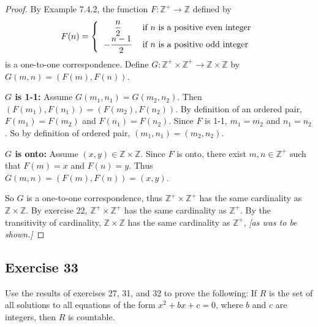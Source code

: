 \documentclass[14pt]{extarticle}
\newcommand{\dps}{\displaystyle}
\newcommand{\Z}{\mathbb{Z}}
\begin{document}
\begin{proof}
    By Example 7.4.2, the function \(F:\Z^+ \to \Z\) defined by
    \[
        F(n) =
        \left\{
        \begin{tabular}{cl}
            \(\dps \frac{n}{2}\)    & if $n$ is a positive even integer \\
            \(\dps -\frac{n-1}{2}\) & if $n$ is a positive odd integer
        \end{tabular}
        \right.
    \]
    is a one-to-one correspondence. Define \(G: \Z^+ \times \Z^+ \to \Z \times \Z\) by \(G(m, n) = (F(m), F(n))\).

        {\bf $G$ is 1-1:} Assume \(G(m_1, n_1) = G(m_2, n_2)\). Then \((F(m_1), F(n_1)) = (F(m_2), F(n_2))\). By definition
    of an ordered pair, \(F(m_1) = F(m_2)\) and \(F(n_1) = F(n_2)\). Since $F$ is 1-1, \(m_1 = m_2\) and \(n_1 =n_2\).
    So by definition of ordered pair, \((m_1, n_1) = (m_2, n_2)\).

        {\bf $G$ is onto:} Assume \((x,y) \in \Z \times \Z\). Since $F$ is onto, there exist \(m, n \in \Z^+\) such that
    \(F(m) = x\) and \(F(n) = y\). Thus \(G(m,n) = (F(m),F(n)) = (x,y)\).

    So $G$ is a one-to-one correspondence, thus \(\Z^+ \times \Z^+\) has the same cardinality as \(\Z \times \Z\). By
    exercise 22, \(\Z^+ \times \Z^+\) has the same cardinality as \(\Z^+\). By the transitivity of cardinality,
    \(\Z \times \Z\) has the same cardinality as \(\Z^+\), {\it [as was to be shown.]}
\end{proof}

\subsection{Exercise 33}
Use the results of exercises 27, 31, and 32 to prove the following: If $R$ is the set of all solutions to all equations of the form \(x^2 + bx + c = 0\), where $b$ and $c$ are integers, then $R$ is countable.
\end{document}
